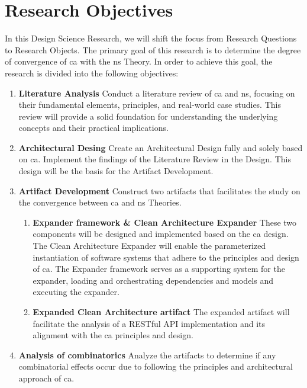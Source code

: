 \section{Research Objectives} \label{sec_research_objectives}

In this Design Science Research, we will shift the focus from Research Questions to
Research Objects. The primary goal of this research is to determine the degree of
convergence of \gls{ca} with the \gls{ns} Theory. In order to achieve this goal, the
research is divided into the following objectives:

\begin{enumerate}
    \item \textbf{Literature Analysis} \newline
    Conduct a literature review of \gls{ca} and \gls{ns}, focusing on their
    fundamental elements, principles, and real-world case studies. This review will
    provide a solid foundation for understanding the underlying concepts and their
    practical implications.
    
    \item \textbf{Architectural Desing} \newline
    Create an Architectural Design fully and solely based on \gls{ca}. Implement the
    findings of the Literature Review in the Design. This design will be the basis for
    the Artifact Development.

    \item \textbf{Artifact Development} \newline
    Construct two artifacts that facilitates the study on the convergence
    between \gls{ca} and \gls{ns} Theories.
    \begin{enumerate}[label*={\arabic*.}]
        
        \item \textbf{Expander framework \& Clean Architecture Expander} \newline        
        These two components will be designed and implemented  based on the \gls{ca}
        design. The Clean Architecture Expander will enable the parameterized
        instantiation of software systems that adhere to the principles and design of
        \gls{ca}. The Expander framework serves as a supporting system for the expander,
        loading and orchestrating dependencies and models and executing the expander.
        
        \item \textbf{Expanded Clean Architecture artifact} \newline
        The expanded artifact will facilitate the analysis of a RESTful API implementation
        and its alignment with the \gls{ca} principles and design.
        
    \end{enumerate}
    
    \item \textbf{Analysis of combinatorics} \newline
    Analyze the artifacts to determine if any combinatorial effects occur due to following
    the principles and architectural approach of \gls{ca}.
\end{enumerate}